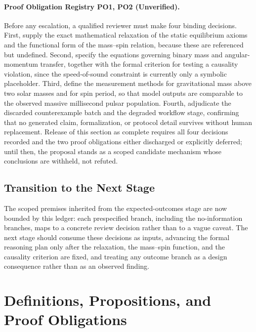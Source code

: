 \documentclass[conference]{IEEEtran}
\begin{document}
\paragraph{Proof Obligation Registry PO1, PO2 (Unverified).} Before any escalation, a qualified reviewer must make four binding decisions. First, supply the exact mathematical relaxation of the static equilibrium axioms and the functional form of the mass--spin relation, because these are referenced but undefined. Second, specify the equations governing binary mass and angular-momentum transfer, together with the formal criterion for testing a causality violation, since the speed-of-sound constraint is currently only a symbolic placeholder. Third, define the measurement methods for gravitational mass above two solar masses and for spin period, so that model outputs are comparable to the observed massive millisecond pulsar population. Fourth, adjudicate the discarded counterexample batch and the degraded workflow stage, confirming that no generated claim, formalization, or protocol detail survives without human replacement. Release of this section as complete requires all four decisions recorded and the two proof obligations either discharged or explicitly deferred; until then, the proposal stands as a scoped candidate mechanism whose conclusions are withheld, not refuted.

\subsection{Transition to the Next Stage}
The scoped premises inherited from the expected-outcomes stage are now bounded by this ledger: each prespecified branch, including the no-information branches, maps to a concrete review decision rather than to a vague caveat. The next stage should consume these decisions as inputs, advancing the formal reasoning plan only after the relaxation, the mass--spin function, and the causality criterion are fixed, and treating any outcome branch as a design consequence rather than as an observed finding.

\section{Definitions, Propositions, and Proof Obligations}
\end{document}
